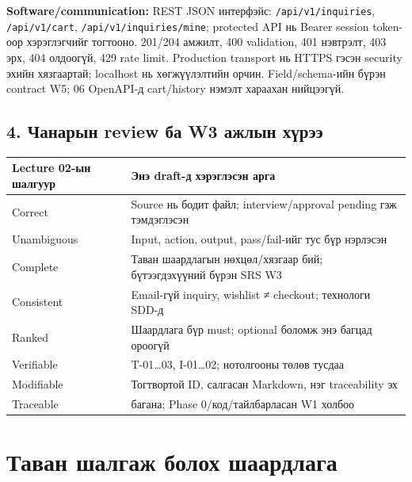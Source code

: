 \documentclass[
  11pt,
  a4paper,
]{article}
\begin{document}
\textbf{Software/communication:} REST JSON интерфэйс:
\nolinkurl{/api/v1/inquiries}, \nolinkurl{/api/v1/cart},
\nolinkurl{/api/v1/inquiries/mine}; protected API нь Bearer session
token-оор хэрэглэгчийг тогтооно. 201/204 амжилт, 400 validation, 401
нэвтрэлт, 403 эрх, 404 олдоогүй, 429 rate limit. Production transport нь
HTTPS гэсэн security эхийн хязгаартай; localhost нь хөгжүүлэлтийн орчин.
Field/schema-ийн бүрэн contract W5; 06 OpenAPI-д cart/history нэмэлт
хараахан нийцээгүй.

\subsection{4. Чанарын review ба W3 ажлын
хүрээ}\label{doc3-ux447ux430ux43dux430ux440ux44bux43d-review-ux431ux430-w3-ux430ux436ux43bux44bux43d-ux445ux4afux440ux44dux44d}

\begin{longtable}[]{@{}
  >{\raggedright\arraybackslash}p{}
  >{\raggedright\arraybackslash}p{}@{}}
\toprule\noalign{}
\begin{minipage}[b]{\linewidth}\raggedright
Lecture 02-ын шалгуур
\end{minipage} & \begin{minipage}[b]{\linewidth}\raggedright
Энэ draft-д хэрэглэсэн арга
\end{minipage} \\
\midrule\noalign{}
\endhead
\bottomrule\noalign{}
\endlastfoot
Correct & Source нь бодит файл; interview/approval pending гэж
тэмдэглэсэн \\
Unambiguous & Input, action, output, pass/fail-ийг тус бүр нэрлэсэн \\
Complete & Таван шаардлагын нөхцөл/хязгаар бий; бүтээгдэхүүний бүрэн SRS
W3 \\
Consistent & Email-гүй inquiry, wishlist ≠ checkout; технологи SDD-д \\
Ranked & Шаардлага бүр must; optional боломж энэ багцад ороогүй \\
Verifiable & T-01\ldots03, I-01\ldots02; нотолгооны төлөв тусдаа \\
Modifiable & Тогтвортой ID, салгасан Markdown, нэг traceability эх \\
Traceable & 8 багана; Phase 0/код/тайлбарласан W1 холбоо \\
\end{longtable}

\clearpage
\section{Таван шалгаж болох
шаардлага}\label{doc4-ux442ux430ux432ux430ux43d-ux448ux430ux43bux433ux430ux436-ux431ux43eux43bux43eux445-ux448ux430ux430ux440ux434ux43bux430ux433ux430}
\end{document}

